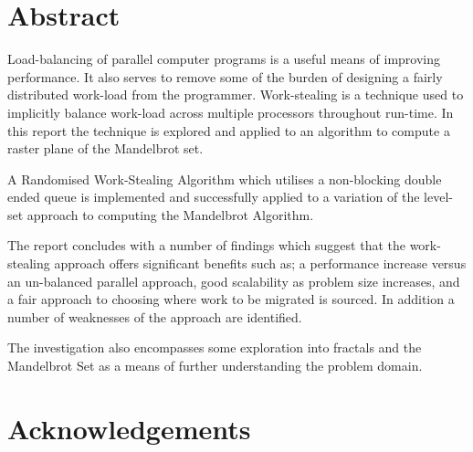 








\section*{Abstract}

Load-balancing of parallel computer programs is a useful means of improving 
performance. It also serves to remove some of the burden of designing a fairly distributed work-load
from the programmer. Work-stealing is a technique used to implicitly balance work-load across
multiple processors throughout run-time. In this report the technique is explored
and applied to an algorithm to compute a raster plane of the Mandelbrot set. 

A Randomised Work-Stealing Algorithm which utilises a non-blocking double ended queue
is implemented and successfully applied to a variation of the level-set approach to
computing the Mandelbrot Algorithm.

The report concludes with a number of findings which suggest that the work-stealing 
approach offers significant benefits such as; a performance increase versus an un-balanced
parallel approach, good scalability as problem size increases, and a fair approach to 
choosing where work to be migrated is sourced. In addition a number of weaknesses
of the approach are identified.

The investigation also encompasses some exploration into fractals and the Mandelbrot Set as a means
of further understanding the problem domain.

\newpage
\section*{Acknowledgements}

